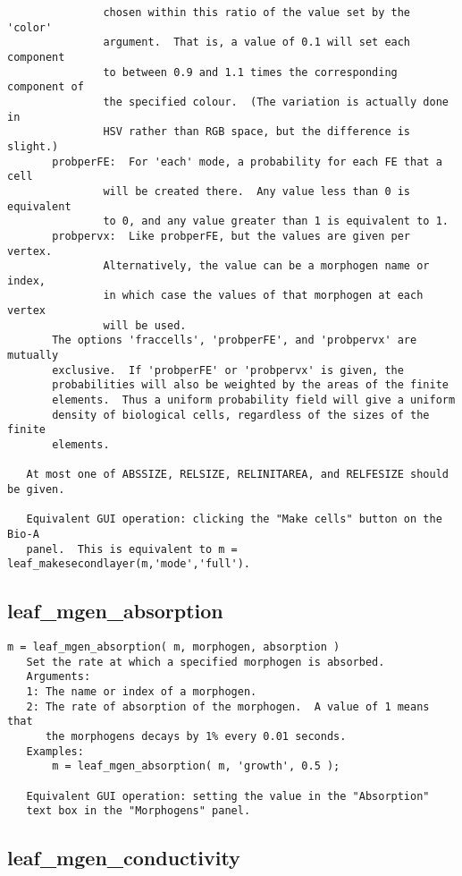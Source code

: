 \begin{verbatim}
               chosen within this ratio of the value set by the 'color'
               argument.  That is, a value of 0.1 will set each component
               to between 0.9 and 1.1 times the corresponding component of
               the specified colour.  (The variation is actually done in
               HSV rather than RGB space, but the difference is slight.)
       probperFE:  For 'each' mode, a probability for each FE that a cell
               will be created there.  Any value less than 0 is equivalent
               to 0, and any value greater than 1 is equivalent to 1.
       probpervx:  Like probperFE, but the values are given per vertex.
               Alternatively, the value can be a morphogen name or index,
               in which case the values of that morphogen at each vertex
               will be used.
       The options 'fraccells', 'probperFE', and 'probpervx' are mutually
       exclusive.  If 'probperFE' or 'probpervx' is given, the
       probabilities will also be weighted by the areas of the finite
       elements.  Thus a uniform probability field will give a uniform
       density of biological cells, regardless of the sizes of the finite
       elements.

   At most one of ABSSIZE, RELSIZE, RELINITAREA, and RELFESIZE should be given.

   Equivalent GUI operation: clicking the "Make cells" button on the Bio-A
   panel.  This is equivalent to m = leaf_makesecondlayer(m,'mode','full').
\end{verbatim}

\subsection{leaf\_mgen\_absorption}\label{section-leaf-mgen-absorption}

\begin{verbatim}
m = leaf_mgen_absorption( m, morphogen, absorption )
   Set the rate at which a specified morphogen is absorbed.
   Arguments:
   1: The name or index of a morphogen.
   2: The rate of absorption of the morphogen.  A value of 1 means that
      the morphogens decays by 1% every 0.01 seconds.
   Examples:
       m = leaf_mgen_absorption( m, 'growth', 0.5 );

   Equivalent GUI operation: setting the value in the "Absorption"
   text box in the "Morphogens" panel.
\end{verbatim}

\subsection{leaf\_mgen\_conductivity}\label{section-leaf-mgen-conductivity}

